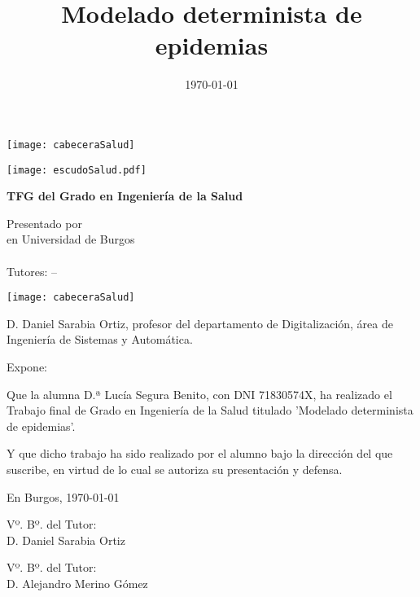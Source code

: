 \documentclass[a4paper,12pt,twoside]{memoir}
\title{Modelado determinista de epidemias}
\author{\nombre}
\date{\today}
\makeatletter
\def\maketitle{
  \null
  \thispagestyle{empty}
\begin{center}
  \noindent\texttt{[image: cabeceraSalud]}\vspace{1.5cm}%
\end{center}
  
  \begin{center}
    \begin{minipage}[c][1.5cm][c]{.20\textwidth}
        \texttt{[image: escudoSalud.pdf]}
    \end{minipage}
  \end{center}
  
  \begin{center}
    \colorbox{cpardoBox}{%
        \begin{minipage}{.8\textwidth}
          \vspace{.5cm}\Large
          \begin{center}
          \textbf{TFG del Grado en Ingeniería de la Salud}\vspace{.6cm}\\
          \textbf{\LARGE\@title{}}
          \end{center}
          \vspace{.2cm}
        \end{minipage}
    }%
  \end{center}
  
  \begin{center}%
  {%
    \noindent\LARGE
    Presentado por \@author{}\\ 
    en Universidad de Burgos\\
    \vspace{0.5cm}
    \noindent\Large
    \@date{}\\
    \vspace{0.5cm}
    Tutores: \@tutor{} -- \@tutorb{}\\
  }%
  \end{center}%
  \null
  \cleardoublepage
  }
\newcommand{\nombre}{Lucía Segura Benito}
\newcommand{\nombreTutor}{Daniel Sarabia Ortiz}
\newcommand{\nombreTutorb}{Alejandro Merino Gómez}
\newcommand{\dni}{71830574X}
\makeatother
\begin{document}
\maketitle


\newpage\null\thispagestyle{empty}\newpage

\thispagestyle{empty}


\noindent\texttt{[image: cabeceraSalud]}\vspace{1cm}

\noindent D. \nombreTutor, profesor del departamento de Digitalización, área de Ingeniería de Sistemas y Automática.

\noindent Expone:

\noindent Que la alumna D.ª \nombre, con DNI \dni, ha realizado el Trabajo final de Grado en Ingeniería de la Salud titulado 'Modelado determinista de epidemias'. 

\noindent Y que dicho trabajo ha sido realizado por el alumno bajo la dirección del que suscribe, en virtud de lo cual se autoriza su presentación y defensa.

\begin{center} %
En Burgos, {\large \today}
\end{center}

\vfill\vfill\vfill

\begin{minipage}{0.45\textwidth}
\begin{flushleft} %
Vº. Bº. del Tutor:\\[2cm]
D. \nombreTutor
\end{flushleft}
\end{minipage}
\hfill
\begin{minipage}{0.45\textwidth}
\begin{flushleft} %
Vº. Bº. del Tutor:\\[2cm]
D. \nombreTutorb
\end{flushleft}
\end{minipage}
\hfill

\vfill



\newpage\null\thispagestyle{empty}\newpage




\frontmatter
\end{document}
